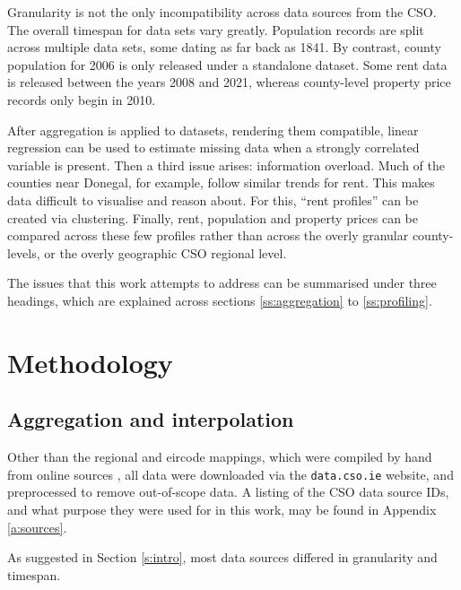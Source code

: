 \documentclass[twocolumn]{article}
\begin{document}
Granularity is not the only incompatibility across data sources from the CSO.
The overall timespan for data sets vary greatly.  Population records are split
across multiple data sets, some dating as far back as 1841.  By contrast,
county population for 2006 is only released under a standalone dataset.  Some
rent data is released between the years 2008 and 2021, whereas county-level
property price records only begin in 2010.

After aggregation is applied to datasets, rendering them compatible, linear
regression can be used to estimate missing data when a strongly correlated
variable is present.  Then a third issue arises: information overload.  Much of
the counties near Donegal, for example, follow similar trends for rent.  This
makes data difficult to visualise and reason about.  For this, ``rent
profiles'' can be created via clustering.  Finally, rent, population and
property prices can be compared across these few profiles rather than across
the overly granular county-levels, or the overly geographic CSO regional
level.

The issues that this work attempts to address can be summarised under three headings,
which are explained across sections \ref{ss:aggregation} to
\ref{ss:profiling}.

\section{Methodology}
\subsection{Aggregation and interpolation\label{ss:aggregation}}
Other than the regional and eircode mappings, which were compiled by hand from
online sources \cite{eircode19, cso_regions}, all data were downloaded via the
{\tt data.cso.ie} website, and preprocessed to remove out-of-scope data.  A listing of
the CSO data source IDs, and what purpose they were used for in this work, may
be found in Appendix \ref{a:sources}.

As suggested in Section \ref{s:intro}, most data sources differed in granularity
and timespan.
\end{document}
